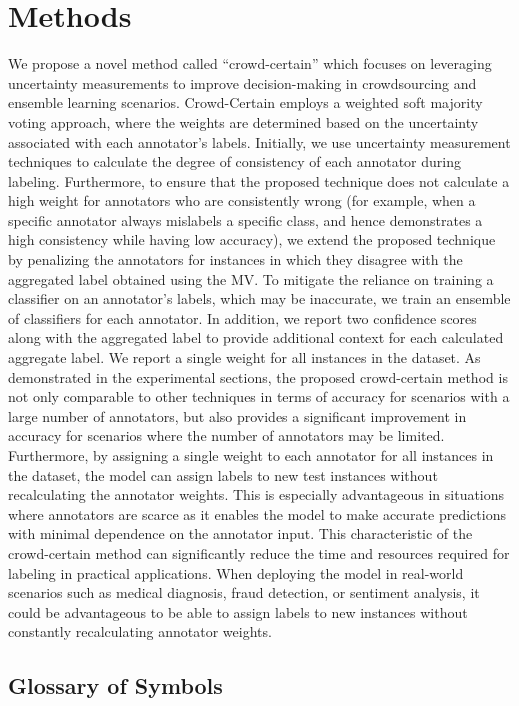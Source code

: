 \documentclass[pdflatex,bst/sn-basic]{bst/sn-jnl}%
\begin{document}
\section{Methods}
We propose a novel method  called ``crowd-certain'' which focuses on leveraging uncertainty measurements to improve decision-making in crowdsourcing and ensemble learning scenarios. Crowd-Certain employs a weighted soft majority voting approach, where the weights are determined based on the uncertainty associated with each annotator's labels. Initially, we use uncertainty measurement techniques to calculate the degree of consistency of each annotator during labeling. Furthermore, to ensure that the proposed technique does not calculate a high weight for annotators who are consistently wrong (for example, when a specific annotator always mislabels a specific class, and hence demonstrates a high consistency while having low accuracy), we extend the proposed technique by penalizing the annotators for instances in which they disagree with the aggregated label obtained using the MV. To mitigate the reliance on training a classifier on an annotator's labels, which may be inaccurate, we train an ensemble of classifiers for each annotator. In addition, we report two confidence scores along with the aggregated label to provide additional context for each calculated aggregate label. We report a single weight for all instances in the dataset. As demonstrated in the experimental sections, the proposed crowd-certain method is not only comparable to other techniques in terms of accuracy for scenarios with a large number of annotators, but also provides a significant improvement in accuracy for scenarios where the number of annotators may be limited. Furthermore, by assigning a single weight to each annotator for all instances in the dataset, the model can assign labels to new test instances without recalculating the annotator weights. This is especially advantageous in situations where annotators are scarce as it enables the model to make accurate predictions with minimal dependence on the annotator input. This characteristic of the crowd-certain method can significantly reduce the time and resources required for labeling in practical applications. When deploying the model in real-world scenarios such as medical diagnosis, fraud detection, or sentiment analysis, it could be advantageous to be able to assign labels to new instances without constantly recalculating annotator weights.


\subsection{Glossary of Symbols}
\end{document}
